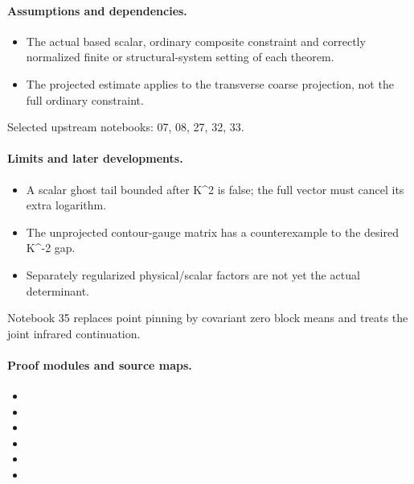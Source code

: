 \documentclass[11pt]{article}
\theoremstyle{remark}
\begin{document}
\paragraph{Assumptions and dependencies.}
\begin{itemize}
\item The actual based scalar, ordinary composite constraint and correctly normalized finite or structural-system setting of each theorem.
\item The projected estimate applies to the transverse coarse projection, not the full ordinary constraint.
\end{itemize}

Selected upstream notebooks: 07, 08, 27, 32, 33.\par

\paragraph{Limits and later developments.}
\begin{itemize}
\item A scalar ghost tail bounded after K\textasciicircum{}2 is false; the full vector must cancel its extra logarithm.
\item The unprojected contour-gauge matrix has a counterexample to the desired K\textasciicircum{}-2 gap.
\item Separately regularized physical/scalar factors are not yet the actual determinant.
\end{itemize}

Notebook 35 replaces point pinning by covariant zero block means and treats the joint infrared continuation.

\paragraph{Proof modules and source maps.}
\begingroup\small
\begin{itemize}
\item {}
\item {}
\item {}
\item {}
\item {}
\item {}
\end{itemize}
\endgroup
\end{document}
